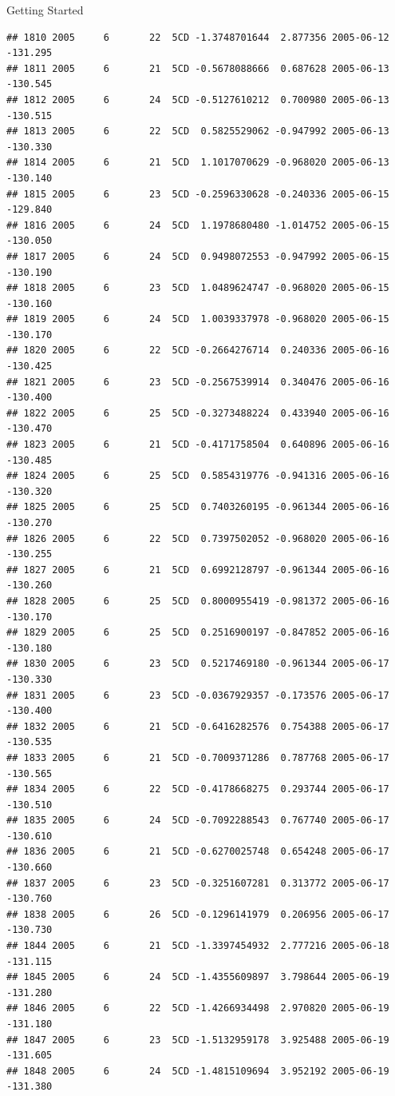 \documentclass[
  ignorenonframetext,
]{beamer}
\begin{document}
\begin{frame}[fragile]{Getting Started}
\begin{verbatim}
## 1810 2005     6       22  5CD -1.3748701644  2.877356 2005-06-12 -131.295
## 1811 2005     6       21  5CD -0.5678088666  0.687628 2005-06-13 -130.545
## 1812 2005     6       24  5CD -0.5127610212  0.700980 2005-06-13 -130.515
## 1813 2005     6       22  5CD  0.5825529062 -0.947992 2005-06-13 -130.330
## 1814 2005     6       21  5CD  1.1017070629 -0.968020 2005-06-13 -130.140
## 1815 2005     6       23  5CD -0.2596330628 -0.240336 2005-06-15 -129.840
## 1816 2005     6       24  5CD  1.1978680480 -1.014752 2005-06-15 -130.050
## 1817 2005     6       24  5CD  0.9498072553 -0.947992 2005-06-15 -130.190
## 1818 2005     6       23  5CD  1.0489624747 -0.968020 2005-06-15 -130.160
## 1819 2005     6       24  5CD  1.0039337978 -0.968020 2005-06-15 -130.170
## 1820 2005     6       22  5CD -0.2664276714  0.240336 2005-06-16 -130.425
## 1821 2005     6       23  5CD -0.2567539914  0.340476 2005-06-16 -130.400
## 1822 2005     6       25  5CD -0.3273488224  0.433940 2005-06-16 -130.470
## 1823 2005     6       21  5CD -0.4171758504  0.640896 2005-06-16 -130.485
## 1824 2005     6       25  5CD  0.5854319776 -0.941316 2005-06-16 -130.320
## 1825 2005     6       25  5CD  0.7403260195 -0.961344 2005-06-16 -130.270
## 1826 2005     6       22  5CD  0.7397502052 -0.968020 2005-06-16 -130.255
## 1827 2005     6       21  5CD  0.6992128797 -0.961344 2005-06-16 -130.260
## 1828 2005     6       25  5CD  0.8000955419 -0.981372 2005-06-16 -130.170
## 1829 2005     6       25  5CD  0.2516900197 -0.847852 2005-06-16 -130.180
## 1830 2005     6       23  5CD  0.5217469180 -0.961344 2005-06-17 -130.330
## 1831 2005     6       23  5CD -0.0367929357 -0.173576 2005-06-17 -130.400
## 1832 2005     6       21  5CD -0.6416282576  0.754388 2005-06-17 -130.535
## 1833 2005     6       21  5CD -0.7009371286  0.787768 2005-06-17 -130.565
## 1834 2005     6       22  5CD -0.4178668275  0.293744 2005-06-17 -130.510
## 1835 2005     6       24  5CD -0.7092288543  0.767740 2005-06-17 -130.610
## 1836 2005     6       21  5CD -0.6270025748  0.654248 2005-06-17 -130.660
## 1837 2005     6       23  5CD -0.3251607281  0.313772 2005-06-17 -130.760
## 1838 2005     6       26  5CD -0.1296141979  0.206956 2005-06-17 -130.730
## 1844 2005     6       21  5CD -1.3397454932  2.777216 2005-06-18 -131.115
## 1845 2005     6       24  5CD -1.4355609897  3.798644 2005-06-19 -131.280
## 1846 2005     6       22  5CD -1.4266934498  2.970820 2005-06-19 -131.180
## 1847 2005     6       23  5CD -1.5132959178  3.925488 2005-06-19 -131.605
## 1848 2005     6       24  5CD -1.4815109694  3.952192 2005-06-19 -131.380

\end{verbatim}
\end{frame}
\end{document}
